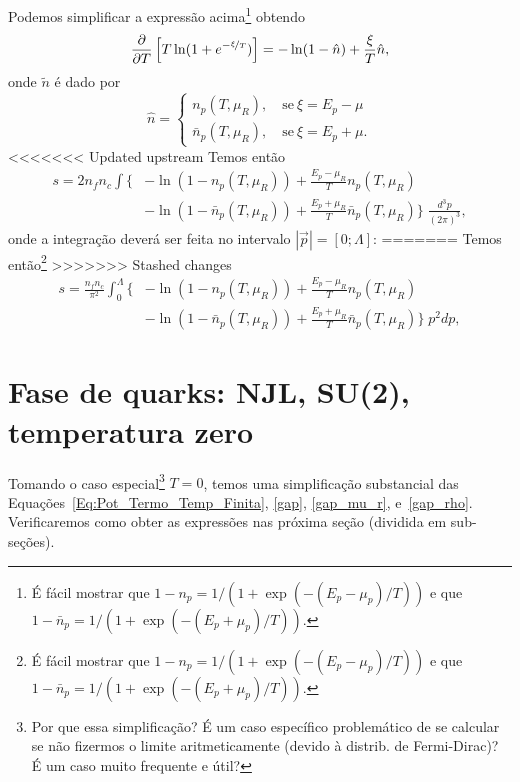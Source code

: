 Podemos simplificar a expressão acima\footnote{É fácil mostrar que $1 - n_p = 1/(1 + \exp(-(E_p - \mu_p)/T))$ e que $1 - \bar{n}_p = 1/(1 + \exp(-(E_p + \mu_p)/T))$.} obtendo
\begin{equation}
	\frac{\partial}{\partial T}\left[T \ln(1 + e^{-\nicefrac{\xi}{T}})\right] = - \ln(1-\hat{n}) + \frac{\xi}{T}\hat{n},
\end{equation}
%
onde $\tilde{n}$ é dado por
\begin{equation}
	\hat{n} = \begin{cases} n_p(T, \mu_R), \quad \textrm{se}~ \xi = E_p - \mu \\ \bar{n}_p(T, \mu_R), \quad \textrm{se}~ \xi = E_p + \mu. \end{cases}
\end{equation}
%
<<<<<<< Updated upstream
Temos então
\begin{equation}\label{Eq:Densidade_de_entropia_deriv_simplificada}
\begin{split}
	s = 2 n_f n_c \int \Big\{&-\ln(1 - n_p(T, \mu_R)) + \frac{E_p - \mu_R}{T} n_p(T, \mu_R) \\
	&- \ln (1 - \bar{n}_p(T, \mu_R)) + \frac{E_p + \mu_R}{T} \bar{n}_p(T, \mu_R)\Big\} \; \frac{d^3p}{(2\pi)^3},
\end{split}
\end{equation}
%
onde a integração deverá ser feita no intervalo $|\vec{p}| = [0;\Lambda]$:
=======
Temos então\footnote{É fácil mostrar que $1 - n_p = 1/(1 + \exp(-(E_p - \mu_p)/T))$ e que $1 - \bar{n}_p = 1/(1 + \exp(-(E_p + \mu_p)/T))$.}
>>>>>>> Stashed changes
\begin{equation}
\begin{split}
	s = \frac{n_f n_c}{\pi^2} \int_0^\Lambda \Big\{&-\ln(1 - n_p(T, \mu_R)) + \frac{E_p - \mu_R}{T} n_p(T, \mu_R) \\
	&- \ln (1 - \bar{n}_p(T, \mu_R)) + \frac{E_p + \mu_R}{T} \bar{n}_p(T, \mu_R)\Big\} \; p^2 dp,
\end{split}
\end{equation}

\section{Fase de quarks: NJL, SU(2), temperatura zero}

Tomando o caso especial\footnote{Por que essa simplificação? É um caso específico problemático de se calcular se não fizermos o limite aritmeticamente (devido à distrib. de Fermi-Dirac)? É um caso muito frequente e útil?} $T = 0$, temos uma simplificação substancial das Equações~\eqref{Eq:Pot_Termo_Temp_Finita}, \eqref{gap}, \eqref{gap_mu_r}, e~\eqref{gap_rho}. Verificaremos como obter as expressões nas próxima seção (dividida em sub-seções).

